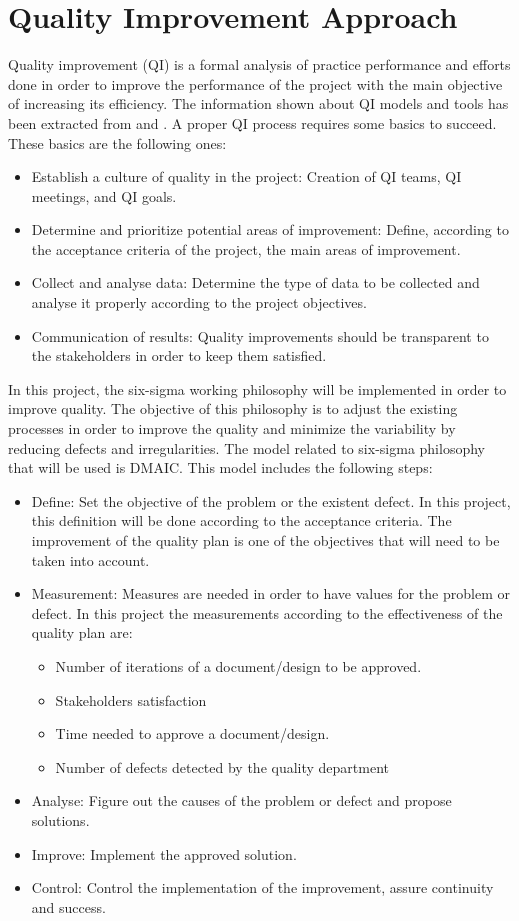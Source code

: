 \section{Quality Improvement Approach}
Quality improvement (QI) is a formal analysis of practice performance and efforts done in order to improve the performance of the project with the main objective of increasing its efficiency. The information shown about QI models and tools has been extracted from \cite{aafp} and \cite{leansolutions}. A proper QI process requires some basics to succeed. These basics are the following ones:
\begin{itemize}
\item Establish a culture of quality in the project: Creation of QI teams, QI meetings, and QI goals.
\item Determine and prioritize potential areas of improvement: Define, according to the acceptance criteria of the project, the main areas of improvement.
\item Collect and analyse data: Determine the type of data to be collected and analyse it properly according to the project objectives.
\item Communication of results: Quality improvements should be transparent to the stakeholders in order to keep them satisfied. 
\end{itemize}
In this project, the six-sigma working philosophy will be implemented in order to improve quality. The objective of this philosophy is to adjust the existing processes in order to improve the quality and minimize the variability by reducing defects and irregularities. The model related to six-sigma philosophy that will be used is DMAIC. This model includes the following steps:
\begin{itemize}
\item Define: Set the objective of the problem or the existent defect. In this project, this definition will be done according to the acceptance criteria. The improvement of the quality plan is one of the objectives that will need to be taken into account.
\item Measurement: Measures are needed in order to have values for the problem or defect. In this project the measurements according to the effectiveness of the quality plan are:
\begin{itemize}
\item Number of iterations of a document/design to be approved.
\item Stakeholders satisfaction
\item Time needed to approve a document/design.
\item Number of defects detected by the quality department 
\end{itemize}
\item Analyse: Figure out the causes of the problem or defect and propose solutions.
\item Improve: Implement the approved solution.
\item Control: Control the implementation of the improvement, assure continuity and success.
\end{itemize}